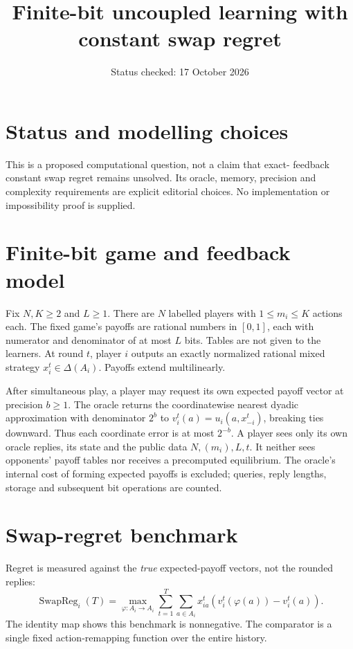 \documentclass[11pt]{article}
\title{Finite-bit uncoupled learning with constant swap regret}
\author{}
\date{Status checked: 17 October 2026}
\newcommand{\SwapReg}{\operatorname{SwapReg}}
\begin{document}
\maketitle
\section*{Status and modelling choices}
This is a proposed computational question, not a claim that exact-
feedback constant swap regret remains unsolved. Its oracle, memory,
precision and complexity requirements are explicit editorial choices.
No implementation or impossibility proof is supplied.

\section*{Finite-bit game and feedback model}
Fix $N,K\geq2$ and $L\geq1$. There are $N$ labelled players with
$1\leq m_i\leq K$ actions each. The fixed game's payoffs are rational
numbers in $[0,1]$, each with numerator and denominator of at most $L$
bits. Tables are not given to the learners. At round $t$, player $i$
outputs an exactly normalized rational mixed strategy
$x_i^t\in\Delta(A_i)$. Payoffs extend multilinearly.

After simultaneous play, a player may request its own expected payoff
vector at precision $b\geq1$. The oracle returns the coordinatewise
nearest dyadic approximation with denominator $2^b$ to
$v_i^t(a)=u_i(a,x_{-i}^t)$, breaking ties downward. Thus each coordinate
error is at most $2^{-b}$. A player sees only its own oracle replies,
its state and the public data $N,(m_i),L,t$. It neither sees opponents'
payoff tables nor receives a precomputed equilibrium. The oracle's
internal cost of forming expected payoffs is excluded; queries, reply
lengths, storage and subsequent bit operations are counted.

\section*{Swap-regret benchmark}
Regret is measured against the \emph{true} expected-payoff vectors, not
the rounded replies:
\[
 \SwapReg_i(T)=\max_{\varphi:A_i\to A_i}
 \sum_{t=1}^T\sum_{a\in A_i}x_{ia}^t
          (v_i^t(\varphi(a))-v_i^t(a)).
\]
The identity map shows this benchmark is nonnegative. The comparator
is a single fixed action-remapping function over the entire history.
\end{document}
